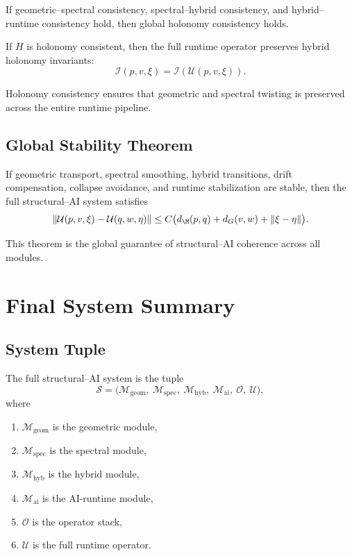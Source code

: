 \documentclass[11pt]{article}
\begin{document}
\begin{lemma}
If geometric--spectral consistency, spectral--hybrid consistency, and
hybrid--runtime consistency hold, then global holonomy consistency holds.
\end{lemma}

\begin{theorem}
If $H$ is holonomy consistent, then the full runtime operator preserves
hybrid holonomy invariants:
\[
\mathcal{I}(p,v,\xi)
= \mathcal{I}(\mathcal{U}(p,v,\xi)).
\]
\end{theorem}

\begin{remark}
Holonomy consistency ensures that geometric and spectral twisting is
preserved across the entire runtime pipeline.
\end{remark}

\subsection{Global Stability Theorem}

\begin{theorem}
If geometric transport, spectral smoothing, hybrid transitions, drift
compensation, collapse avoidance, and runtime stabilization are stable,
then the full structural--AI system satisfies
\[
\| \mathcal{U}(p,v,\xi) - \mathcal{U}(q,w,\eta) \|
\le C \big( d_\M(p,q) + d_G(v,w) + \|\xi - \eta\| \big).
\]
\]
\end{theorem}

\begin{remark}
This theorem is the global guarantee of structural--AI coherence across
all modules.
\end{remark}

\section{Final System Summary}

\subsection{System Tuple}

\begin{definition}
The full structural--AI system is the tuple
\[
\mathcal{S}
= \big(
\mathcal{M}_\mathrm{geom},\ 
\mathcal{M}_\mathrm{spec},\ 
\mathcal{M}_\mathrm{hyb},\ 
\mathcal{M}_\mathrm{ai},\ 
\mathcal{O},\ 
\mathcal{U}
\big),
\]
where
\begin{enumerate}[label=(\alph*)]
    \item $\mathcal{M}_\mathrm{geom}$ is the geometric module,
    \item $\mathcal{M}_\mathrm{spec}$ is the spectral module,
    \item $\mathcal{M}_\mathrm{hyb}$ is the hybrid module,
    \item $\mathcal{M}_\mathrm{ai}$ is the AI-runtime module,
    \item $\mathcal{O}$ is the operator stack,
    \item $\mathcal{U}$ is the full runtime operator.
\end{enumerate}
\end{definition}
\end{document}
